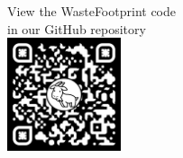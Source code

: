 \documentclass[a0paper,fleqn]{betterposter}
\begin{document}
{\begin{center}
    \vspace{30pt}
    {\fontsize{36}{40}\selectfont View the WasteFootprint code\\ in our GitHub repository\\}
    \vspace{40pt}
    \includegraphics[width=0.25\textwidth]{img/qr-code.pdf}
    \end{center}
}
\end{document}
